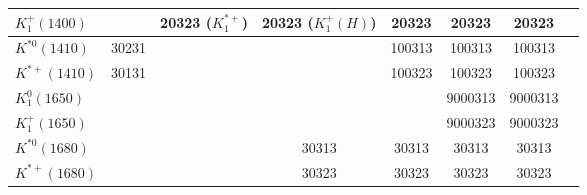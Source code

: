 \begin{tabular}{|l@{\tstrut}|c|c|c|c|c|c|c|}
$K_1^+(1400)$    &       & 20323 ($K_1^{*+}$) & 20323 ($K_1^+(H)$) & 20323 & 20323 & 20323 \\ \hline
$K^{*0}(1410)$   & 30231 &       &       &    100313 &       100313 & 100313 \\ \hline
$K^{*+}(1410)$   & 30131 &       &       &    100323 &       100323 & 100323 \\ \hline
$K_1^0(1650)$    &       &       &       &           & 9000313 & 9000313 \\ \hline
$K_1^+(1650)$    &       &       &       &           & 9000323 & 9000323 \\ \hline
$K^{*0}(1680)$   &       &       & 30313 &     30313 &        30313 & 30313 \\ \hline
$K^{*+}(1680)$   &       &       & 30323 &     30323 &        30323 & 30323 \\ \hline
\end{tabular}

